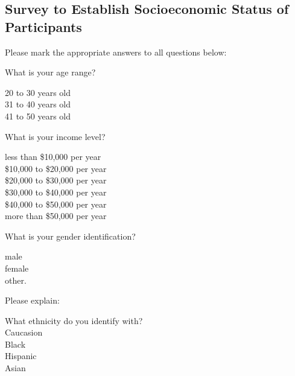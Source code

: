 \vspace{2em}
\subsection*{Survey to Establish Socioeconomic Status of Participants}

Please mark the appropriate answers to all questions below:

What is your age range?

\underline{\hspace{.5cm}} 20 to 30 years old \\
\underline{\hspace{.5cm}} 31 to 40 years old \\
\underline{\hspace{.5cm}} 41 to 50 years old

What is your income level?

\underline{\hspace{.5cm}} less than \$10,000 per year \\
\underline{\hspace{.5cm}} \$10,000 to \$20,000 per year \\
\underline{\hspace{.5cm}} \$20,000 to \$30,000 per year \\
\underline{\hspace{.5cm}} \$30,000 to \$40,000 per year \\
\underline{\hspace{.5cm}} \$40,000 to \$50,000 per year \\
\underline{\hspace{.5cm}} more than \$50,000 per year

What is your gender identification?

\underline{\hspace{.5cm}} male \\
\underline{\hspace{.5cm}} female \\
\underline{\hspace{.5cm}} other.

Please explain: 

What ethnicity do you identify with? \\
\underline{\hspace{.5cm}} Caucasion \\
\underline{\hspace{.5cm}} Black \\
\underline{\hspace{.5cm}} Hispanic \\
\underline{\hspace{.5cm}} Asian
